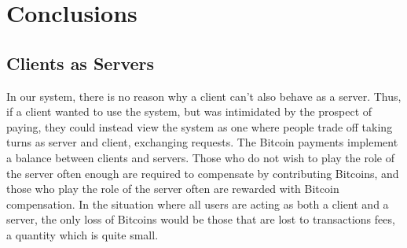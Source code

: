 \section{Conclusions}
\label{sec:conclusion}

\subsection{Clients as Servers}

In our system, there is no reason why a client can't also behave as a server. Thus, if a client wanted to use the system, but was intimidated by the prospect of paying, they could instead view the system as one where people trade off taking turns as server and client, exchanging requests. The Bitcoin payments implement a balance between clients and servers. Those who do not wish to play the role of the server often enough are required to compensate by contributing Bitcoins, and those who play the role of the server often are rewarded with Bitcoin compensation. In the situation where all users are acting as both a client and a server, the only loss of Bitcoins would be those that are lost to transactions fees, a quantity which is quite small. 
